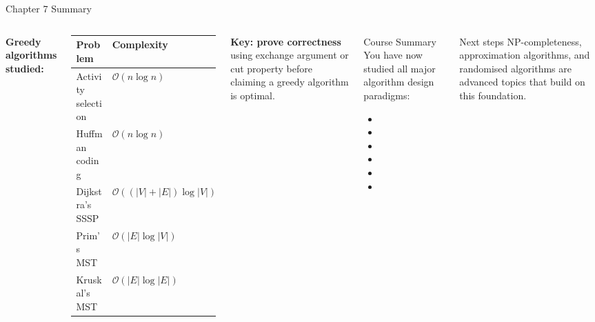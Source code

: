 \documentclass[aspectratio=169]{beamer}
\begin{document}
\begin{frame}[shrink=12]{Chapter 7 Summary}
  \begin{columns}[T]
      \textbf{Greedy algorithms studied:}
      \begin{tabular}{ll}
        \toprule
        Problem & Complexity \\
        \midrule
        Activity selection & $\mathcal{O}(n\log n)$ \\
        Huffman coding & $\mathcal{O}(n\log n)$ \\
        Dijkstra's SSSP & $\mathcal{O}((|V|{+}|E|)\log|V|)$ \\
        Prim's MST & $\mathcal{O}(|E|\log|V|)$ \\
        Kruskal's MST & $\mathcal{O}(|E|\log|E|)$ \\
        \bottomrule
      \end{tabular}
      \vspace{0.3em}
      \textbf{Key: prove correctness} using exchange argument or
      cut property before claiming a greedy algorithm is optimal.
      \begin{block}{Course Summary}
        You have now studied all major algorithm design paradigms:
        \begin{itemize}
          \item {}
          \item {}
          \item {}
          \item {}
          \item {}
          \item {}
        \end{itemize}
      \end{block}
      \begin{exampleblock}{Next steps}
        NP-completeness, approximation algorithms, and randomised
        algorithms are advanced topics that build on this foundation.
      \end{exampleblock}
  \end{columns}
\end{frame}
\end{document}

